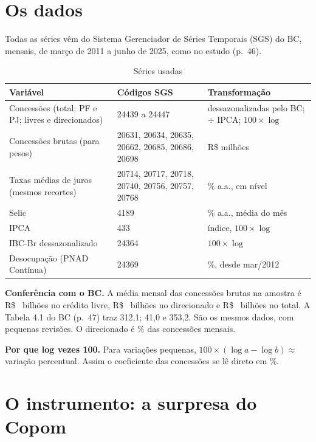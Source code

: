 \documentclass[11pt,a4paper]{article}
\begin{document}
\section{Os dados}\label{sec:dados}

Todas as séries vêm do Sistema Gerenciador de Séries Temporais (SGS) do BC, mensais, de março de
2011 a junho de 2025, como no estudo (p.~46).

\begin{table}[H]\centering\small
\caption{Séries usadas}
\begin{tabular}{p{5.4cm}p{4.2cm}p{5.3cm}}
\toprule
Variável & Códigos SGS & Transformação \\
\midrule
Concessões (total; PF e PJ; livres e direcionados) & 24439 a 24447 & dessazonalizadas pelo BC; $\div$ IPCA; $100\times\log$ \\
Concessões brutas (para pesos) & 20631, 20634, 20635, 20662, 20685, 20686, 20698 & R\$ milhões \\
Taxas médias de juros (mesmos recortes) & 20714, 20717, 20718, 20740, 20756, 20757, 20768 & \% a.a., em nível \\
Selic & 4189 & \% a.a., média do mês \\
IPCA & 433 & índice, $100\times\log$ \\
IBC-Br dessazonalizado & 24364 & $100\times\log$ \\
Desocupação (PNAD Contínua) & 24369 & \%, desde mar/2012 \\
\bottomrule
\end{tabular}
\end{table}

\textbf{Conferência com o BC.} A média mensal das concessões brutas na amostra é R\$~\MediaLivre{}
bilhões no crédito livre, R\$~\MediaDir{} bilhões no direcionado e R\$~\MediaTotal{} bilhões no total.
A Tabela 4.1 do BC (p.~47) traz 312,1; 41,0 e 353,2. São os mesmos dados, com pequenas revisões. O
direcionado é \ParticDir\% das concessões mensais.

\textbf{Por que log vezes 100.} Para variações pequenas, $100\times(\log a - \log b)\approx$ variação
percentual. Assim o coeficiente das concessões se lê direto em \%.

\section{O instrumento: a surpresa do Copom}\label{sec:surpresa}
\end{document}
